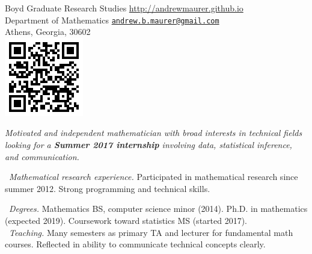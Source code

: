 \documentclass[10pt,a4paper]{article}
\begin{document}
\sloppy  %



\spacedhrule{0.9em}{-0.4em}  %


\noindent
Boyd Graduate Research Studies\tabto{7cm} \url{http://andrewmaurer.github.io} \\
Department of Mathematics \tabto{7cm} \href{mailto:andrew.b.maurer@gmail.com}{\texttt{andrew.b.maurer@gmail.com}} \\
Athens, Georgia, 30602 \ \\
\tabto{14.5cm}\includegraphics[scale=.5]{qr.png}\\

\spacedhrule{-.5em}{-.4em}


\vspace{-1.3em}  %
\begin{multicols}{2}  %
\noindent \emph{Motivated and independent mathematician with broad interests in technical fields looking for a \textbf{Summer 2017 internship} involving data, statistical inference, and communication.}

\textbullet~\textit{Mathematical research experience.} Participated in mathematical research since summer 2012. Strong programming and technical skills.

\textbullet~\textit{Degrees.} Mathematics BS, computer science minor (2014). Ph.D. in mathematics (expected 2019). Coursework toward statistics MS (started 2017).
\\
\indent~\textbullet \textit{Teaching.} Many semesters as primary TA and lecturer for fundamental math courses. Reflected in ability to communicate technical concepts clearly.
\end{multicols}

\spacedhrule{0em}{-.04em}
\end{document}
